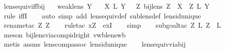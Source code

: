 \begin{isabellebody}
\isamarkupfalse%
%
\endisatagproof
{\isafoldproof}%
%
\isadelimproof
\isanewline
%
\endisadelimproof
\isanewline
{}\isamarkupfalse%
\ lens{\isacharunderscore}equiv{\isacharunderscore}iff{\isacharunderscore}bij{\isacharcolon}\isanewline
\ \ \ {\isachardoublequoteopen}weak{\isacharunderscore}lens\ Y{\isachardoublequoteclose}\isanewline
\ \ \ {\isachardoublequoteopen}X\ {\isasymapprox}\isactrlsub L\ Y\ {\isasymlongleftrightarrow}\ {\isacharparenleft}{\isasymexists}\ Z{\isachardot}\ bij{\isacharunderscore}lens\ Z\ {\isasymand}\ X\ {\isacharequal}\ Z\ {\isacharsemicolon}\isactrlsub L\ Y{\isacharparenright}{\isachardoublequoteclose}\isanewline
%
\isadelimproof
\ \ %
\endisadelimproof
%
\isatagproof
{}\isamarkupfalse%
\ {\isacharparenleft}rule\ iffI{\isacharparenright}\isanewline
\ \ \isamarkupfalse%
\ {\isacharparenleft}auto\ simp\ add{\isacharcolon}\ lens{\isacharunderscore}equiv{\isacharunderscore}def\ sublens{\isacharunderscore}def\ lens{\isacharunderscore}id{\isacharunderscore}unique{\isacharparenright}{\isacharbrackleft}{}{\isacharbrackright}\isanewline
\ \ \isamarkupfalse%
\ {\isacharparenleft}rename{\isacharunderscore}tac\ Z\ Z\isanewline
\ \ \isamarkupfalse%
\ {\isacharparenleft}rule{\isacharunderscore}tac\ x{\isacharequal}{\isachardoublequoteopen}Z\ \ exI{\isacharparenright}\isanewline
\ \ \isamarkupfalse%
\ {\isacharparenleft}simp{\isacharparenright}\isanewline
\ \ \isamarkupfalse%
\ {\isacharparenleft}subgoal{\isacharunderscore}tac\ {\isachardoublequoteopen}Z\ {\isacharsemicolon}\isactrlsub L\ Z\ {\isacharequal}\ {}\isactrlsub L{\isachardoublequoteclose}{\isacharparenright}\isanewline
\ \ \isamarkupfalse%
\ {\isacharparenleft}meson\ bij{\isacharunderscore}lens{\isacharunderscore}via{\isacharunderscore}comp{\isacharunderscore}id{\isacharunderscore}right\ vwb{\isacharunderscore}lens{\isacharunderscore}wb{\isacharparenright}\isanewline
\ \ \isamarkupfalse%
\ {\isacharparenleft}metis\ assms\ lens{\isacharunderscore}comp{\isacharunderscore}assoc\ lens{\isacharunderscore}id{\isacharunderscore}unique{\isacharparenright}\isanewline
\ \ \isamarkupfalse%
\ lens{\isacharunderscore}equiv{\isacharunderscore}via{\isacharunderscore}bij\ \isamarkupfalse%

\end{isabellebody}
